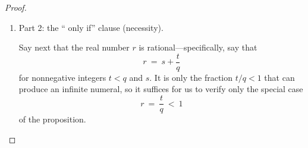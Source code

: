 \begin{proof}
\begin{enumerate}
We learned in Section~\ref{sec:geometric-sums} that infinite summations such as
$\sum_{i=1}^\infty b^{-2-3i}$ in (\ref{eq:sum-in-numeral}) {\em converge}---meaning that {\em they have finite rational sums}---and we learned how to compute these sums.  For the purposes of the current proof, we just accept this fact, and we denote the summation's finite rational sum by $p/q$.

\medskip

Collecting all of this information, we find that there exist {\em integers} $m$, $n$, $p$, and $q$ such that
\[ r \ = \ m \ + \ n/ b^{2} \ + \ p/q \ = \
\frac{mqb^2 + nq + pb^2}{qb^2}. \]
The number $r$ is, thus, the ratio of two integers; hence, by definition, it is rational.

\item 
{\small\sf Part 2: the `` only if'' clause (necessity).}

\smallskip

Say next that the real number $r$ is rational---specifically, say that
\[ r \ = \ s + \frac{t}{q} \]
for nonnegative integers $t < q$ and $s$.  It is only the fraction $t/q < 1$ that can produce an infinite numeral, so it suffices for us to verify only the special case
\[ r \ = \ \frac{t}{q} \ < \ 1 \]
of the proposition.

\smallskip



\end{enumerate}
\end{proof}
